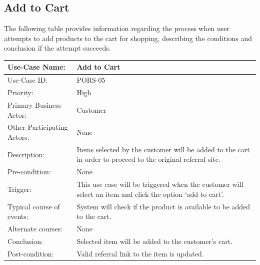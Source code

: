 \subsection{Add to Cart}
The following table provides information regarding the process when user attempts to add products to the cart for shopping, describing the conditions and conclusion if the attempt succeeds. 
\begin{center}
    \begin{tabular}{ @{}|p{5cm}||p{7cm}|  }
    \hline
    Use-Case Name: & Add to Cart  \\ \hline
    Use-Case ID: & PORS-05 \\ \hline
    Priority: & High \\ \hline
    Primary Business Actor: & Customer \\ \hline
    Other Participating Actors: & None \\ \hline
    Description: & Items selected by the customer will be added to the cart in order to proceed to the original referral site. \\ \hline
    Pre-condition: & None \\ \hline
    Trigger: & This use case will be triggered when the customer will select an item and click the option ‘add to cart’. \\ \hline
    Typical course of events: & System will check if the product is available to be added to the cart. \\ \hline
    Alternate courses: & None \\ \hline
    Conclusion: &  Selected item will be added to the customer’s cart.\\ \hline
    Post-condition: &  Valid referral link to the item is updated. \\ \hline
    \end{tabular}
\end{center}

